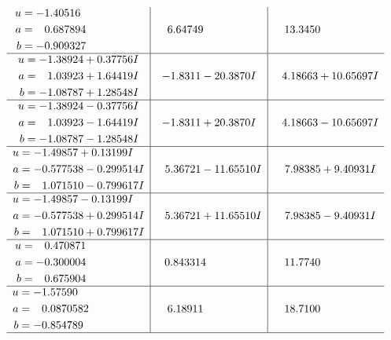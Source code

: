 \documentclass[1p]{elsarticle_modified}
\theoremstyle{definition}
\begin{document}
$$\begin{array}{c|c|c}
\begin{aligned}
u &= -1.40516\phantom{ +0.000000I} \\
a &= \phantom{-}0.687894\phantom{ +0.000000I} \\
b &= -0.909327\phantom{ +0.000000I}\end{aligned}
 & \phantom{-}6.64749\phantom{ +0.000000I} & \phantom{-}13.3450\phantom{ +0.000000I} \\ \hline\begin{aligned}
u &= -1.38924 + 0.37756 I \\
a &= \phantom{-}1.03923 + 1.64419 I \\
b &= -1.08787 + 1.28548 I\end{aligned}
 & -1.8311 - 20.3870 I & \phantom{-}4.18663 + 10.65697 I \\ \hline\begin{aligned}
u &= -1.38924 - 0.37756 I \\
a &= \phantom{-}1.03923 - 1.64419 I \\
b &= -1.08787 - 1.28548 I\end{aligned}
 & -1.8311 + 20.3870 I & \phantom{-}4.18663 - 10.65697 I \\ \hline\begin{aligned}
u &= -1.49857 + 0.13199 I \\
a &= -0.577538 - 0.299514 I \\
b &= \phantom{-}1.071510 - 0.799617 I\end{aligned}
 & \phantom{-}5.36721 - 11.65510 I & \phantom{-}7.98385 + 9.40931 I \\ \hline\begin{aligned}
u &= -1.49857 - 0.13199 I \\
a &= -0.577538 + 0.299514 I \\
b &= \phantom{-}1.071510 + 0.799617 I\end{aligned}
 & \phantom{-}5.36721 + 11.65510 I & \phantom{-}7.98385 - 9.40931 I \\ \hline\begin{aligned}
u &= \phantom{-}0.470871\phantom{ +0.000000I} \\
a &= -0.300004\phantom{ +0.000000I} \\
b &= \phantom{-}0.675904\phantom{ +0.000000I}\end{aligned}
 & \phantom{-}0.843314\phantom{ +0.000000I} & \phantom{-}11.7740\phantom{ +0.000000I} \\ \hline\begin{aligned}
u &= -1.57590\phantom{ +0.000000I} \\
a &= \phantom{-}0.0870582\phantom{ +0.000000I} \\
b &= -0.854789\phantom{ +0.000000I}\end{aligned}
 & \phantom{-}6.18911\phantom{ +0.000000I} & \phantom{-}18.7100\phantom{ +0.000000I}\\
 \hline 
 \end{array}$$\newpage\newpage\renewcommand{\arraystretch}{1}
\end{document}
